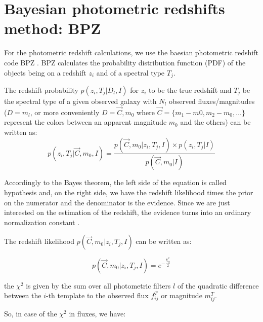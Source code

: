 \documentclass[9pt]{memoir}
\begin{document}
%
%

\section{Bayesian photometric redshifts method: BPZ}
\label{sec:bpz}

For the photometric redshift calculations, we use the baesian photometric redshift code BPZ \citep{Benitez.2000a}. BPZ calculates the probability distribution function (PDF) of the objects being on a redshift $z_i$ and of a spectral type $T_j$.

The redshift probability $p(z_i, T_j|D_l,I)$ for $z_i$ to be the true redshift and $T_j$ be the spectral type of a given observed galaxy with $N_l$ observed fluxes/magnitudes ($D = m_l$, or more conveniently $D = \vec{C}, m_0$ where $\vec{C} = \{m_1 - m0, m_2 - m_0, \ldots\}$ represent the colors between an apparent magnitude $m_0$ and the others)  can be written as:
\begin{equation}
p(z_i,T_j|\vec{C}, m_0,  I) = \frac{p(\vec{C}, m_0|z_i,T_j,I) \times p(z_i, T_j|I)}{p(\vec{C}, m_0|I)}
\end{equation}

Accordingly to the Bayes theorem, the left side of the equation is called hypothesis and, on the right side, we have the redshift likelihood times the prior on the numerator and the denominator is the evidence. Since we are just interested on the estimation of the redshift, the evidence turns into an ordinary normalization constant \citep{Sivia.Skilling.2006}.

The redshift likelihood $p(\vec{C}, m_0|z_i,T_j,I)$ can be written as:

\begin{equation}
p(\vec{C}, m_0|z_i,T_j,I) = e^{-\frac{\chi_{ij}^2}{2}}
\end{equation}

the $\chi^2$ is given by the sum over all photometric filters $l$ of the quadratic difference between the $i$-th template to the observed flux $f^T_{ij}$ or magnitude $m^T_{ij}$.

So, in case of the $\chi^2$ in fluxes, we have:
\end{document}
